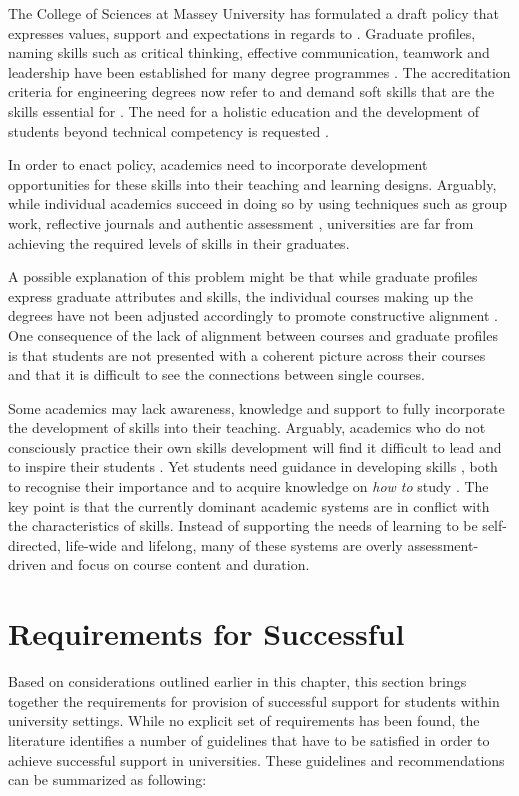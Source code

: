 The College of Sciences at Massey University has formulated a draft \LLLs policy
\citep{MasseyUniversity2008} that expresses values, support and expectations in
regards to \LLLsn. Graduate profiles, naming \LLLs skills such as critical
thinking, effective communication, teamwork and leadership have been established
for many degree programmes \citep{Davies2003,McAlister2003}. The accreditation
criteria for engineering degrees now refer to and demand soft skills that are
the skills essential for \LLLs \citep{Aller2005,Guest2006,Muffo2001}. The need
for a holistic education and the development of students beyond technical
competency is requested
\citep{Brakke2002,Davies2003,Dowling2006,Fallows2003,Grabowski2004,Hernon2006}.

In order to enact policy, academics need to incorporate development
opportunities for these skills into their teaching and learning designs.
Arguably, while individual academics succeed in doing so by using techniques
such as group work, reflective journals and authentic assessment
\citep{Clarke2003,Lombardi2008}, universities are far from achieving the
required levels of \LLLs skills in their graduates.

A possible explanation of this problem might be that while graduate profiles
express graduate attributes and \LLLs skills, the individual courses making up
the degrees have not been adjusted accordingly to promote constructive alignment
\citep{Hughes2010,Biggs2007}. One consequence of the lack of alignment between
courses and graduate profiles is that students are not presented with a coherent
picture across their courses and that it is difficult to see the connections
between single courses. 

Some academics may lack awareness, knowledge and support to fully incorporate
the development of \LLLs skills into their teaching. Arguably, academics who do
not consciously practice their own \LLLs skills development will find it
difficult to lead and to inspire their students \citep{Linden2003}. Yet
students need guidance in developing \LLLs skills \citep{Leone2019}, both to
recognise their importance and to acquire knowledge on \textit{how to} study
\citep{Medel-Anonuevo2001}. The key point is that the currently dominant
academic systems are in conflict with the characteristics of \LLLs skills.
Instead of supporting the needs of learning to be self-directed, life-wide and
lifelong, many of these systems are overly assessment-driven and focus on course
content and duration.

\section{Requirements for Successful \LLLc}
\label{sec:needs}
Based on considerations outlined earlier in this chapter, this section brings
together the requirements for provision of successful \LLLs support for
students within university settings. While no explicit set of requirements has
been found, the literature identifies a number of guidelines that have to be
satisfied in order to achieve successful \LLLs support in universities. These
guidelines and recommendations can be summarized as following:
 
